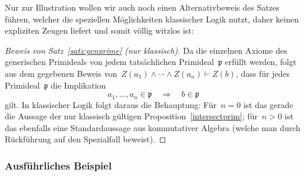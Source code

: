 \documentclass[a4paper,ngerman,12pt]{scrartcl}
\theoremstyle{definition}
\theoremstyle{plain}
\theoremstyle{remark}
\newcommand{\pp}{\mathfrak{p}}
\newcommand{\seq}[1]{\mathrel{\vdash\!\!\!_{#1}}}
\renewcommand{\_}{\mathpunct{.}\,}
\newcommand{\?}{\,{:}\,}
\begin{document}
Nur zur Illustration wollen wir auch noch einen Alternativbeweis des Satzes
führen, welcher die speziellen Möglichkeiten klassischer Logik nutzt, daher
keinen expliziten Zeugen liefert und somit völlig witzlos ist:
\begin{proof}[Beweis von Satz~\ref{satz:genprime} (nur klassisch)]
Da die einzelnen Axiome des generischen Primideals von jedem tatsächlichen
Primideal~$\pp$ erfüllt werden, folgt aus dem gegebenen Beweis von~$Z(a_1) \wedge
\cdots \wedge Z(a_n) \seq{} Z(b)$, dass für jedes Primideal~$\pp$ die
Implikation
\[ a_1,\ldots,a_n \in \pp \quad\Longrightarrow\quad b \in \pp \]
gilt. In klassischer Logik folgt daraus die Behauptung: Für~$n = 0$ ist das
gerade die Aussage der nur klassisch gültigen Proposition~\ref{intersectprim};
für~$n > 0$ ist das ebenfalls eine Standardaussage aus kommutativer Algebra
(welche man durch Rückführung auf den Spezialfall beweist).
\end{proof}


\subsubsection*{Ausführliches Beispiel}
\end{document}
